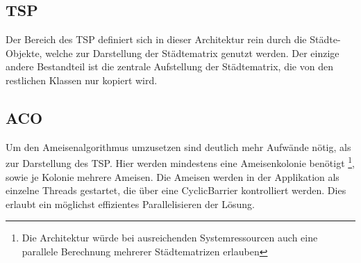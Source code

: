 {	\subsection{TSP}
	Der Bereich des TSP definiert sich in dieser Architektur rein durch die Städte-Objekte, welche zur Darstellung der Städtematrix genutzt werden. Der einzige andere Bestandteil ist die zentrale Aufstellung der Städtematrix, die von den restlichen Klassen nur kopiert wird.
	
	\subsection{ACO}
	Um den Ameisenalgorithmus umzusetzen sind deutlich mehr Aufwände nötig, als zur Darstellung des TSP. Hier werden mindestens eine Ameisenkolonie benötigt \footnote{Die Architektur würde bei ausreichenden Systemressourcen auch eine parallele Berechnung mehrerer Städtematrizen erlauben},
	sowie je Kolonie mehrere Ameisen.
	\newline
	Die Ameisen werden in der Applikation als einzelne Threads gestartet, die über eine CyclicBarrier kontrolliert werden. Dies erlaubt ein möglichst effizientes Parallelisieren der Lösung.
	
	
}